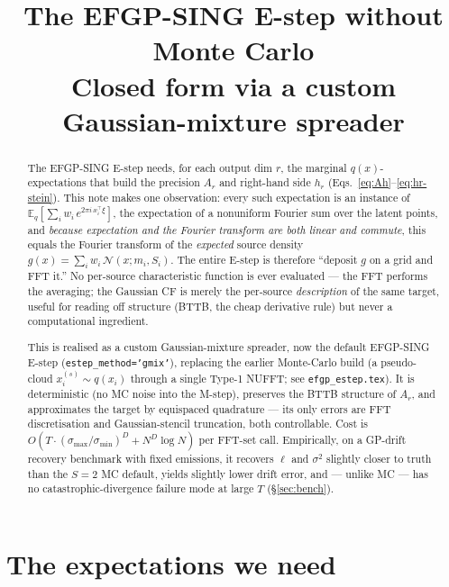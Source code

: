 \documentclass[11pt]{article}
\title{The EFGP-SING E-step without Monte Carlo\\
\large Closed form via a custom Gaussian-mixture spreader}
\author{}
\date{}
\newcommand{\E}{\mathbb{E}}
\newcommand{\code}[1]{\texttt{\small #1}}
\begin{document}
\maketitle

\begin{abstract}
\noindent
The EFGP-SING E-step needs, for each output dim $r$, the marginal
$q(x)$-expectations that build the precision $A_r$ and right-hand side
$h_r$ (Eqs.~\eqref{eq:Ah}--\eqref{eq:hr-stein}).  This note makes one
observation: every such expectation is an instance of
$\E_q[\sum_i w_i\,e^{2\pi i\,x_i^\top\xi}]$, the expectation of a
nonuniform Fourier sum over the latent points, and \emph{because
expectation and the Fourier transform are both linear and commute},
this equals the Fourier transform of the \emph{expected} source density
$g(x)=\sum_i w_i\,\mathcal{N}(x;m_i,S_i)$.  The entire E-step is
therefore ``deposit $g$ on a grid and FFT it.''  No per-source
characteristic function is ever evaluated --- the FFT performs the
averaging; the Gaussian CF is merely the per-source \emph{description}
of the same target, useful for reading off structure (BTTB, the cheap
derivative rule) but never a computational ingredient.

This is realised as a custom Gaussian-mixture spreader, now the default
EFGP-SING E-step (\code{estep\_method='gmix'}), replacing the earlier
Monte-Carlo build (a pseudo-cloud $x_i^{(s)}\!\sim\!q(x_i)$ through a
single Type-1 NUFFT; see \texttt{efgp\_estep.tex}).  It is
deterministic (no MC noise into the M-step), preserves the BTTB
structure of $A_r$, and approximates the target by equispaced
quadrature --- its only errors are FFT discretisation and
Gaussian-stencil truncation, both controllable.  Cost is
$O(T \cdot (\sigma_{\max}/\sigma_{\min})^D + N^D \log N)$ per FFT-set
call.  Empirically, on a GP-drift recovery benchmark with fixed
emissions, it recovers $\ell$ and $\sigma^2$ slightly closer to truth
than the $S\!=\!2$ MC default, yields slightly lower drift error, and
--- unlike MC --- has no catastrophic-divergence failure mode at large
$T$ (\S\ref{sec:bench}).
\end{abstract}

\tableofcontents

\section{The expectations we need}
\label{sec:setup}
\end{document}
